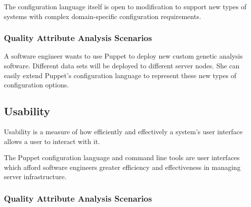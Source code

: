 \documentclass[a4paper]{article}
\begin{document}
The configuration language itself is open to modification to support new types of systems with complex domain-specific configuration requirements.




\subsubsection{Quality Attribute Analysis Scenarios}

A software engineer wants to use Puppet to deploy new custom genetic analysis software. Different data sets will be deployed to different server nodes. She can easily extend Puppet's configuration language to represent these new types of configuration options.

\subsection{Usability}



Usability is a measure of how efficiently and effectively a system's user interface allows a user to interact with it.

The Puppet configuration language and command line tools are user interfaces which afford software engineers greater efficiency and effectiveness in managing server infrastructure.

\subsubsection{Quality Attribute Analysis Scenarios}
\end{document}
